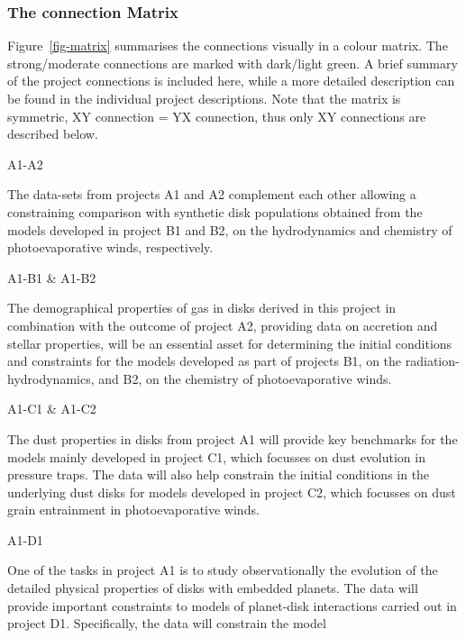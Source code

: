\documentclass[10pt,fleqn,twoside]{article}
\begin{document}
\subsubsection{The connection Matrix}
\label{sub-matrix}
Figure~\ref{fig-matrix} summarises the connections visually in a
colour matrix. The strong/moderate connections are marked with
dark/light green. A brief summary of the project connections is
included here, while a more detailed description can be found in the
individual project descriptions. Note that the matrix is symmetric, XY connection = YX
connection, thus only XY connections are described below.   \\
\begin{Emphasize} A1-A2 \end{Emphasize} The 
data-sets from projects A1 and A2 complement each other allowing a
constraining comparison with synthetic disk
populations obtained from the models developed in project B1 and B2,
on the hydrodynamics and chemistry of photoevaporative winds,
respectively. \\
\begin{Emphasize} A1-B1 \& A1-B2 \end{Emphasize} The demographical properties of gas in disks
derived in this project in combination 
with the outcome of project A2, providing data on accretion and
stellar properties, will
be an essential asset for determining the initial conditions and constraints
for the models developed as part of projects B1, on the radiation-hydrodynamics, and
B2, on the chemistry of photoevaporative winds.\\
\begin{Emphasize} A1-C1 \& A1-C2 \end{Emphasize} 
The dust properties in disks from project A1 
will provide  key benchmarks for the models mainly developed in
project C1, which focusses on dust evolution in pressure traps. The
data will
also help constrain the initial conditions in the underlying dust
disks for models developed in project C2, which focusses on dust grain
entrainment in photoevaporative winds. \\
\begin{Emphasize} A1-D1 \end{Emphasize} One of the tasks
in project A1 is to study observationally the 
evolution of the detailed physical properties of disks with embedded
planets. The data will provide important constraints to models of planet-disk
interactions carried out in project D1. Specifically, the data will
constrain the model 
\end{document}
